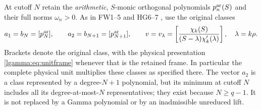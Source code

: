 At cutoff $N$ retain the \emph{arithmetic}, $S$-monic orthogonal
polynomials $p_n^{\rm ar}(S)$ and their full norms $\omega_n>0$.
As in FW1--5 and HG6--7 \cite{lgamma:FW,lgamma:HG}, use the original classes
\begin{equation}\label{lgamma:eq:nativetriple}
 a_1=b_N=[p_N^{\rm ar}],\qquad
 a_2=b_{N+1}=[p_{N+1}^{\rm ar}],\qquad
 v=v_\lambda=\left[\frac{\chi_k(S)}{(S-\lambda)\chi_k'(\lambda)}\right],
 \quad\lambda=k\rho.
\end{equation}
Brackets denote the original class, with the physical presentation
\eqref{lgamma:eq:unitframe} whenever that is the retained frame.  In particular
the complete physical unit multiplies these classes as specified there.
The vector $a_2$ is a class represented by a degree-$N+1$ polynomial,
but its minimum at cutoff $N$ includes all its degree-at-most-$N$
representatives; they exist because $N\ge q-1$.  It is not replaced
by a Gamma polynomial or by an inadmissible unreduced lift.

